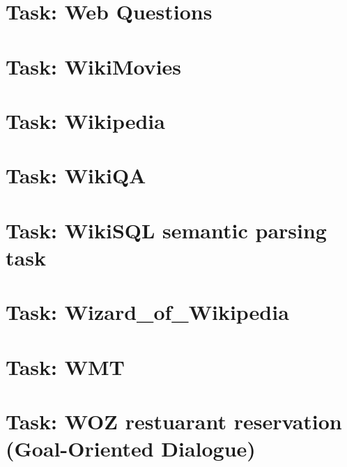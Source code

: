 \documentclass[twoside]{book}
\newcommand{\+}{\discretionary{\mbox{\scriptsize$\hookleftarrow$}}{}{}}
\begin{document}
\chapter{Task\+: Web Questions}
\label{md_parlai_tasks_webquestions_README}

\chapter{Task\+: Wiki\+Movies}
\label{md_parlai_tasks_wikimovies_README}

\chapter{Task\+: Wikipedia}
\label{md_parlai_tasks_wikipedia_README}

\chapter{Task\+: Wiki\+QA}
\label{md_parlai_tasks_wikiqa_README}

\chapter{Task\+: Wiki\+S\+QL semantic parsing task}
\label{md_parlai_tasks_wikisql_README}

\chapter{Task\+: Wizard\+\_\+of\+\_\+\+Wikipedia}
\label{md_parlai_tasks_wizard_of_wikipedia_README}

\chapter{Task\+: W\+MT}
\label{md_parlai_tasks_wmt_README}

\chapter{Task\+: W\+OZ restuarant reservation (Goal-\/\+Oriented Dialogue)}
\label{md_parlai_tasks_woz_README}

\end{document}
